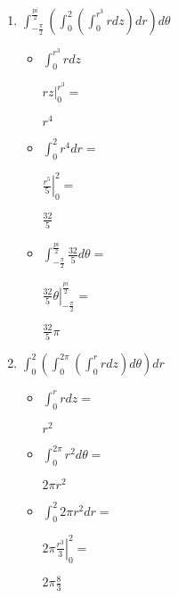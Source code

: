 \documentclass[../practica_09.tex]{subfiles}
\begin{document}
    \begin{enumerate}
        \item $ \int_{-\frac{\pi}{2}}^{\frac{pi}{2}} (\int_0^2 (\int_0^{r^3} r dz) dr) d\theta $
        
            \begin{itemize}
                \item $\int_0^{r^3} r dz$

                    $ \left. rz \right |_0^{r^3} = $

                    $ r^4 $

                \item $\int_0^2 r^4 dr = $
                
                    $ \left. \frac{r^5}{5} \right |_0^2 = $

                    $ \frac{32}{5} $

                \item $\int_{-\frac{\pi}{2}}^{\frac{pi}{2}} \frac{32}{5} d\theta =$
                
                    $ \left. \frac{32}{5} \theta \right |_{-\frac{\pi}{2}}^{\frac{pi}{2}} = $

                    $ \frac{32}{5}\pi $

            \end{itemize}

        \item $ \int_0^2 (\int_0^{2\pi} (\int_0^r r dz) d\theta) dr $
        
            \begin{itemize}
                \item $\int_0^r r dz = $
                
                    $ r^2 $

                \item  $ \int_0^{2\pi} r^2 d\theta = $
                
                    $ 2\pi r^2 $

                \item $ \int_0^2 2\pi r^2 dr = $
                
                    $2\pi \left. \frac{r^3}{3} \right |_0^2 = $

                    $2\pi \frac{8}{3} $

            \end{itemize}

    \end{enumerate}
\end{document}
